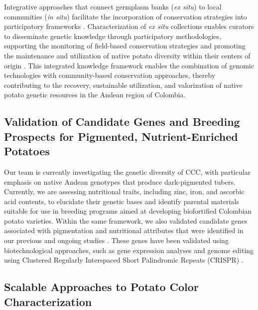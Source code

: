 \documentclass[pdflatex,sn-mathphys-ay]{sn-jnl}%
\begin{document}
Integrative approaches that connect germplasm banks (\textit{ex situ}) to local communities (\textit{in situ}) facilitate the incorporation of conservation strategies into participatory frameworks \citep{luttringhaus2021dynamic}. Characterization of \textit{ex situ} collections enables curators to disseminate genetic knowledge through participatory methodologies, supporting the monitoring of field-based conservation strategies and promoting the maintenance and utilization of native potato diversity within their centers of origin \citep{arcespatial,dawson2023identifying}. This integrated knowledge framework enables the combination of genomic technologies with community-based conservation approaches, thereby contributing to the recovery, sustainable utilization, and valorization of native potato genetic resources in the Andean region of Colombia.



\subsection{Validation of Candidate Genes and Breeding Prospects for Pigmented, Nutrient-Enriched Potatoes}



Our team is currently investigating the genetic diversity of CCC, with particular emphasis on native Andean genotypes that produce dark-pigmented tubers. Currently, we are assessing nutritional traits, including zinc, iron, and ascorbic acid contents, to elucidate their genetic bases and identify parental materials suitable for use in breeding programs aimed at developing biofortified Colombian potato varieties. Within the same framework, we also validated candidate genes associated with pigmentation and nutritional attributes that were identified in our previous and ongoing studies \citep{berdugo2023phenotypic, Berdugo2017}. These genes have been validated using biotechnological approaches, such as gene expression analyses and genome editing using Clustered Regularly Interspaced Short Palindromic Repeats (CRISPR) \citep{Berdugo2024}.


\subsection{Scalable Approaches to Potato Color Characterization}
\end{document}
